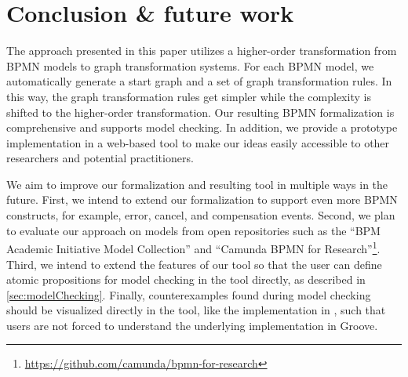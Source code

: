 \documentclass[runningheads]{llncs}
\begin{document}
\section{Conclusion \& future work} \label{sec:conclusion}
The approach presented in this paper utilizes a higher-order transformation from BPMN models to graph transformation systems. 
For each BPMN model, we automatically generate a start graph and a set of graph transformation rules.
In this way, the graph transformation rules get simpler while the complexity is shifted to the higher-order transformation.
Our resulting BPMN formalization is comprehensive and supports model checking.
In addition, we provide a prototype implementation in a web-based tool to make our ideas easily accessible to other researchers and potential practitioners.

We aim to improve our formalization and resulting tool in multiple ways in the future.
First, we intend to extend our formalization to support even more BPMN constructs, for example, error, cancel, and compensation events.
Second, we plan to evaluate our approach on models from open repositories such as the \enquote{BPM Academic Initiative Model Collection} \cite{weskeModelCollectionBusiness2020} and  \enquote{Camunda BPMN for
Research}\footnote{\url{https://github.com/camunda/bpmn-for-research}}.
Third, we intend to extend the features of our tool so that the user can define atomic propositions for model checking in the tool directly, as described in \autoref{sec:modelChecking}.
Finally, counterexamples found during model checking should be visualized directly in the tool, like the implementation in \cite{houhouFirstOrderLogicVerification2022}, such that users are not forced to understand the underlying implementation in Groove.

 

\end{document}
